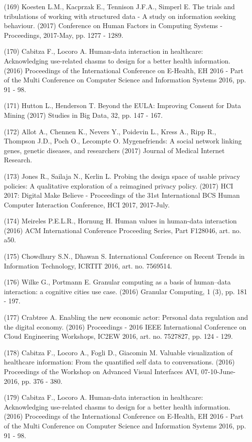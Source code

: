 \documentclass[
	12pt,				%
	oneside,			%
	a4paper,			%
	english,			%
	brazil				%
	]{abntex2ppgsi}
\begin{document}
\begin{apendicesenv}
(169) Koesten L.M., Kacprzak E., Tennison J.F.A., Simperl E. The trials and tribulations of working with structured data - A study on information seeking behaviour. (2017) Conference on Human Factors in Computing Systems - Proceedings, 2017-May, pp. 1277 - 1289.

(170) Cabitza F., Locoro A. Human-data interaction in healthcare: Acknowledging use-related chasms to design for a better health information. (2016) Proceedings of the International Conference on E-Health, EH 2016 - Part of the Multi Conference on Computer Science and Information Systems 2016, pp. 91 - 98.

(171) Hutton L., Henderson T. Beyond the EULA: Improving Consent for Data Mining (2017) Studies in Big Data, 32, pp. 147 - 167.

(172) Allot A., Chennen K., Nevers Y., Poidevin L., Kress A., Ripp R., Thompson J.D., Poch O., Lecompte O. Mygenefriends: A social network linking genes, genetic diseases, and researchers (2017) Journal of Medical Internet Research.

(173) Jones R., Sailaja N., Kerlin L. Probing the design space of usable privacy policies: A qualitative exploration of a reimagined privacy policy. (2017) HCI 2017: Digital Make Believe - Proceedings of the 31st International BCS Human Computer Interaction Conference, HCI 2017, 2017-July.

(174) Meireles P.E.L.R., Hornung H. Human values in human-data interaction (2016) ACM International Conference Proceeding Series, Part F128046, art. no. a50.

(175) Chowdhury S.N., Dhawan S. International Conference on Recent Trends in Information Technology, ICRTIT 2016, art. no. 7569514.

(176) Wilke G., Portmann E. Granular computing as a basis of human–data interaction: a cognitive cities use case. (2016) Granular Computing, 1 (3), pp. 181 - 197.

(177) Crabtree A. Enabling the new economic actor: Personal data regulation and the digital economy. (2016) Proceedings - 2016 IEEE International Conference on Cloud Engineering Workshops, IC2EW 2016, art. no. 7527827, pp. 124 - 129.

(178) Cabitza F., Locoro A., Fogli D., Giacomin M. Valuable visualization of healthcare information: From the quantified self data to conversations. (2016) Proceedings of the Workshop on Advanced Visual Interfaces AVI, 07-10-June-2016, pp. 376 - 380.

(179) Cabitza F., Locoro A. Human-data interaction in healthcare: Acknowledging use-related chasms to design for a better health information. (2016) Proceedings of the International Conference on E-Health, EH 2016 - Part of the Multi Conference on Computer Science and Information Systems 2016, pp. 91 - 98.


\end{apendicesenv}
\end{document}
